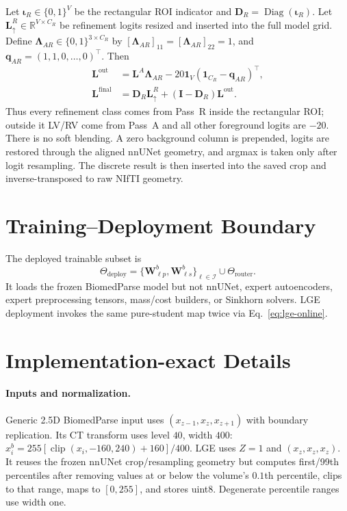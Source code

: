 \documentclass[10pt]{article}
\newcommand{\R}{\mathbb{R}}
\newcommand{\cI}{\mathcal{I}}
\newcommand{\ones}{\bm{1}}
\newcommand{\diag}{\operatorname{Diag}}
\newcommand{\clip}{\operatorname{clip}}
\begin{document}
Let $\bm\iota_R\in\{0,1\}^V$ be the rectangular ROI indicator and
$\bm D_R=\diag(\bm\iota_R)$.  Let $\bm L_\uparrow^R\in\R^{V\times C_R}$ be
refinement logits resized and inserted into the full model grid.  Define
$\bm\Lambda_{AR}\in\{0,1\}^{3\times C_R}$ by
$[\bm\Lambda_{AR}]_{11}=[\bm\Lambda_{AR}]_{22}=1$, and
$\bm q_{AR}=(1,1,0,\ldots,0)^\top$.  Then
\begin{equation}
\boxed{
\begin{aligned}
 \bm L^{\mathrm{out}}
 &=\bm L^A\bm\Lambda_{AR}
   -20\ones_V(\ones_{C_R}-\bm q_{AR})^\top,\\
 \bm L^{\mathrm{final}}
 &=\bm D_R\bm L_\uparrow^R
   +(\bm I-\bm D_R)\bm L^{\mathrm{out}} .
\end{aligned}}
\label{eq:lge-hard-switch}
\end{equation}
Thus every refinement class comes from Pass~R inside the rectangular ROI;
outside it LV/RV come from Pass~A and all other foreground logits are $-20$.
There is no soft blending.  A zero background column is prepended, logits are
restored through the aligned nnUNet geometry, and argmax is taken only after
logit resampling.  The discrete result is then inserted into the saved crop and
inverse-transposed to raw NIfTI geometry.

\section{Training--Deployment Boundary}

The deployed trainable subset is
\[
 \Theta_{\mathrm{deploy}}
 =\{\bm W_{\ell p}^b,\bm W_{\ell s}^b\}_{\ell\in\cI}
  \cup\Theta_{\mathrm{router}}.
\]
It loads the frozen BiomedParse model but not nnUNet, expert autoencoders,
expert preprocessing tensors, mass/cost builders, or Sinkhorn solvers.  LGE
deployment invokes the same pure-student map twice via Eq.~\eqref{eq:lge-online}.

\appendix
\section{Implementation-exact Details}

\paragraph{Inputs and normalization.}
Generic 2.5D BiomedParse input uses
$(x_{z-1},x_z,x_{z+1})$ with boundary replication.  Its CT transform uses
level $40$, width $400$:
$x_i^b=255[\clip(x_i,-160,240)+160]/400$.
LGE uses $Z=1$ and $(x_z,x_z,x_z)$.  It reuses the frozen nnUNet crop/resampling
geometry but computes first/99th percentiles after removing values at or below
the volume's $0.1$th percentile, clips to that range, maps to $[0,255]$, and
stores uint8.  Degenerate percentile ranges use width one.
\end{document}

